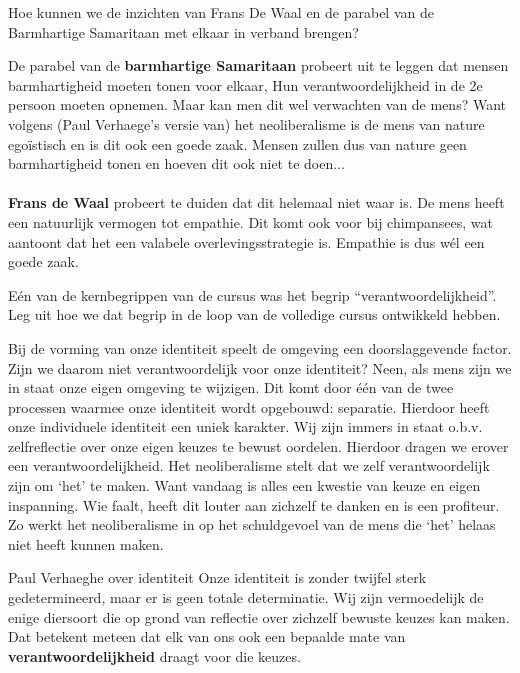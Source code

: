 \documentclass[main.tex]{subfiles}
\begin{document}
\begin{examenvraag}
    \begin{vraag}
        Hoe kunnen we de inzichten van Frans De Waal en de parabel van de Barmhartige Samaritaan met elkaar in verband brengen?
    \end{vraag}

    \begin{antwoord}
    	De parabel van de \textbf{barmhartige Samaritaan} probeert uit te leggen dat mensen barmhartigheid
    	moeten tonen voor elkaar, Hun verantwoordelijkheid in de 2e persoon moeten opnemen. Maar kan men dit wel verwachten van de mens? Want volgens (Paul Verhaege's
    	versie van) het neoliberalisme is de mens van nature egoïstisch en is dit ook een goede zaak.
    	Mensen zullen dus van nature geen barmhartigheid tonen en hoeven dit ook niet te doen...\\\\
    	\textbf{Frans de Waal} probeert te duiden dat dit helemaal niet waar is. De mens heeft een 
    	natuurlijk vermogen tot empathie. Dit komt ook voor bij chimpansees, wat aantoont dat
    	het een valabele overlevingsstrategie is. Empathie is dus wél een goede zaak.
    \end{antwoord}
\end{examenvraag}


\begin{examenvraag}
    \begin{vraag}
        Eén van de kernbegrippen van de cursus was het begrip “verantwoordelijkheid”. Leg uit hoe we dat begrip in de loop van de volledige cursus ontwikkeld hebben.
    \end{vraag}

    \begin{antwoord}
	Bij de vorming van onze identiteit speelt de omgeving een doorslaggevende factor.‭ ‬Zijn we 
	daarom niet verantwoordelijk voor onze identiteit‭? ‬Neen,‭ ‬als mens zijn we in staat onze eigen 
	omgeving te wijzigen.‭ ‬Dit komt door één van de‭ ‬twee processen waarmee onze identiteit wordt 
	opgebouwd:‭ ‬separatie.‭ ‬Hierdoor heeft onze individuele identiteit een uniek karakter.‭ ‬Wij zijn 
	immers in staat o.b.v.‭ ‬zelfreflectie over onze eigen keuzes te bewust oordelen.‭ ‬Hierdoor dragen 
	we erover een verantwoordelijkheid.‭
	‬Het neoliberalisme stelt dat we zelf verantwoordelijk zijn om‭ ‬‘het‭’‬ te maken.‭ ‬Want vandaag is 
	alles een kwestie van keuze en eigen inspanning.‭ ‬Wie faalt,‭ ‬heeft dit louter aan zichzelf te 
	danken en is een profiteur.‭ ‬Zo werkt het neoliberalisme in op het schuldgevoel van de mens die‭ 
	‬‘het‭’‬ helaas niet heeft kunnen maken.
    \end{antwoord}
    \begin{citaat}{Paul Verhaeghe over identiteit}
    Onze
identiteit is zonder twijfel sterk gedetermineerd, maar er is geen totale determinatie. Wij zijn
vermoedelijk de enige diersoort die op grond van reflectie over zichzelf bewuste keuzes kan maken.
Dat betekent meteen dat elk van ons ook een bepaalde mate van \textbf{verantwoordelijkheid} draagt voor die
keuzes. 
    \end{citaat}
\end{examenvraag}
\end{document}
